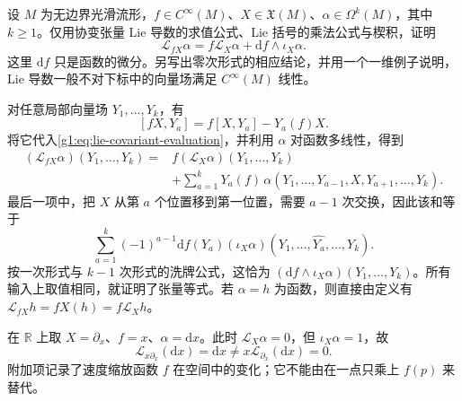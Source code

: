 \begin{exercise}
	\label{g1:exr:1303-function-times-lie}
	设 \(M\) 为无边界光滑流形，\(f\in C^\infty(M)\)、\(X\in\mathfrak X(M)\)、\(\alpha\in\Omega^k(M)\)，其中 \(k\ge1\)。仅用协变张量 Lie 导数的求值公式、Lie 括号的乘法公式与楔积，证明
	\[
		\mathcal L_{fX}\alpha=f\mathcal L_X\alpha+\mathrm{d}f\wedge\iota_X\alpha.
	\]
	这里 \(\mathrm{d}f\) 只是函数的微分。另写出零次形式的相应结论，并用一个一维例子说明，Lie 导数一般不对下标中的向量场满足 \(C^\infty(M)\) 线性。
\end{exercise}
\begin{solution}
	对任意局部向量场 \(Y_1,\ldots,Y_k\)，有
	\[
		[fX,Y_a]=f[X,Y_a]-Y_a(f)X.
	\]
	将它代入\eqref{g1:eq:lie-covariant-evaluation}，并利用 \(\alpha\) 对函数多线性，得到
	\[
		\begin{split}
			(\mathcal L_{fX}\alpha)(Y_1,\ldots,Y_k)
			={}&f(\mathcal L_X\alpha)(Y_1,\ldots,Y_k)\\
			&+\sum_{a=1}^kY_a(f)\,
			\alpha(Y_1,\ldots,Y_{a-1},X,Y_{a+1},\ldots,Y_k).
		\end{split}
	\]
	最后一项中，把 \(X\) 从第 \(a\) 个位置移到第一位置，需要 \(a-1\) 次交换，因此该和等于
	\[
		\sum_{a=1}^k(-1)^{a-1}\mathrm{d}f(Y_a)
		(\iota_X\alpha)(Y_1,\ldots,\widehat{Y_a},\ldots,Y_k).
	\]
	按一次形式与 \(k-1\) 次形式的洗牌公式，这恰为 \((\mathrm{d}f\wedge\iota_X\alpha)(Y_1,\ldots,Y_k)\)。所有输入上取值相同，就证明了张量等式。若 \(\alpha=h\) 为函数，则直接由定义有 \(\mathcal L_{fX}h=fX(h)=f\mathcal L_Xh\)。

	在 \(\mathbb R\) 上取 \(X=\partial_x\)、\(f=x\)、\(\alpha=\mathrm{d}x\)。此时 \(\mathcal L_X\alpha=0\)，但 \(\iota_X\alpha=1\)，故
	\[
		\mathcal L_{x\partial_x}(\mathrm{d}x)=\mathrm{d}x
		\ne x\mathcal L_{\partial_x}(\mathrm{d}x)=0.
	\]
	附加项记录了速度缩放函数 \(f\) 在空间中的变化；它不能由在一点只乘上 \(f(p)\) 来替代。
\end{solution}


